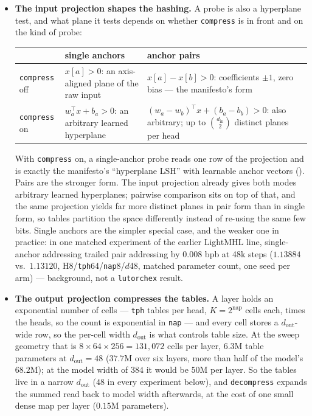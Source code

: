 \documentclass[11pt]{article}
\DeclareRobustCommand{\code}[1]{{\renewcommand{\_}{\textunderscore\allowbreak}\texttt{#1}}}
\begin{document}
\begin{itemize}\itemsep1pt
\item \textbf{The input projection shapes the hashing.} A probe is also a hyperplane test, and what
  plane it tests depends on whether \code{compress} is in front and on the kind of probe:
  \begin{center}\footnotesize
  \begin{tabular}{@{}l >{\raggedright\arraybackslash}p{4.9cm} >{\raggedright\arraybackslash}p{5.6cm}@{}}
  \toprule
  & single anchors & anchor pairs \\
  \midrule
  \code{compress} off & $x[a]>0$: an axis-aligned plane of the raw input & $x[a]-x[b]>0$: coefficients $\pm1$, zero bias --- the manifesto's form \\
  \code{compress} on & $w_a^\top x+b_a>0$: an arbitrary learned hyperplane & $(w_a-w_b)^\top x+(b_a-b_b)>0$: also arbitrary; up to $\binom{d_\text{in}}{2}$ distinct planes per head \\
  \bottomrule
  \end{tabular}
  \end{center}
  With \code{compress} on, a single-anchor probe reads one row of the projection and is exactly the
  manifesto's ``hyperplane LSH'' with learnable anchor vectors (\citealp[\S VIII-H]{manifesto}).
  Pairs are the stronger form. The input projection already gives both modes arbitrary learned
  hyperplanes; pairwise comparison sits on top of that, and the same projection yields far more distinct
  planes in pair form than in single form, so tables partition the space differently instead of re-using
  the same few bits. Single anchors are the simpler special case, and the weaker one in practice: in one
  matched experiment of the earlier LightMHL line, single-anchor addressing trailed pair addressing by
  $0.008$ bpb at 48k steps ($1.13884$ vs.\ $1.13120$, H8/\code{tph}64/\code{nap}8/$d$48, matched parameter
  count, one seed per arm) --- background, not a \code{lutorch\_ex} result.
\item \textbf{The output projection compresses the tables.} A layer holds an exponential number of
  cells --- \code{tph} tables per head, $K=2^{\text{nap}}$ cells each, times the heads, so the count is
  exponential in \code{nap} --- and every cell stores a $d_\text{out}$-wide row, so the per-cell width
  $d_\text{out}$ is what controls table size. At the sweep geometry
  that is $8\times64\times256=131{,}072$ cells per layer, $6.3$M table parameters at $d_\text{out}=48$
  ($37.7$M over six layers, more than half of the model's $68.2$M); at the model width of $384$ it would
  be $50$M per layer. So the tables live in a narrow $d_\text{out}$ ($48$ in every experiment below), and
  \code{decompress} expands the summed read back to model width afterwards, at the cost of one small
  dense map per layer ($0.15$M parameters).
\end{itemize}
\end{document}
